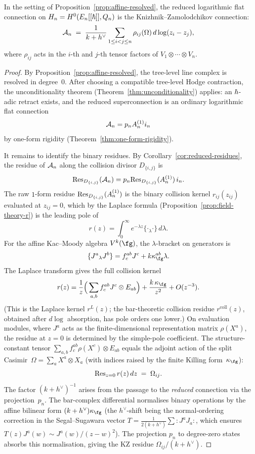 \begin{theorem}
\label{thm:reduced-equals-kz}
In the setting of Proposition~\textup{\ref{prop:affine-resolved}}, the reduced logarithmic flat connection on $H_n = H^0(E_n[[\hbar]], Q_n)$ is the Knizhnik--Zamolodchikov connection:
\[
 \mathcal A_n \;=\; \frac{1}{k + h^\vee}\sum_{1 \leq i < j \leq n} \rho_{ij}(\Omega)\, d\log(z_i - z_j),
\]
where $\rho_{ij}$ acts in the $i$-th and $j$-th tensor factors of\/ $V_1 \otimes \cdots \otimes V_n$.
\end{theorem}

\begin{proof}
By Proposition~\ref{prop:affine-resolved}, the tree-level line complex is resolved in degree~$0$. After choosing a compatible tree-level Hodge contraction, the unconditionality theorem (Theorem~\ref{thm:unconditionality}) applies: an $\hbar$-adic retract exists, and the reduced superconnection is an ordinary logarithmic flat connection
\[
 \mathcal A_n = p_n A_n^{(1)} i_n
\]
by one-form rigidity (Theorem~\ref{thm:one-form-rigidity}).

It remains to identify the binary residues. By Corollary~\ref{cor:reduced-residues}, the residue of $\mathcal A_n$ along the collision divisor $D_{\{i,j\}}$ is
\[
 \mathrm{Res}_{D_{\{i,j\}}}(\mathcal A_n) = p_n \mathrm{Res}_{D_{\{i,j\}}}(A_n^{(1)}) \, i_n.
\]
The raw $1$-form residue $\mathrm{Res}_{D_{\{i,j\}}}(A_n^{(1)})$ is the binary collision kernel $r_{ij}(z_{ij})$ evaluated at $z_{ij} = 0$, which by the Laplace formula (Proposition~\ref{prop:field-theory-r}) is the leading pole of
\[
 r(z) = \int_0^\infty e^{-\lambda z} \{\cdot{}_\lambda \cdot\}\, d\lambda.
\]
For the affine Kac--Moody algebra $V^k(\fg)$, the $\lambda$-bracket on generators is
\[
 \{J^a{}_\lambda J^b\} = f^{ab}_c J^c + k \kappa_\fg^{ab} \lambda.
\]
The Laplace transform gives the full collision kernel
\[
 r(z) = \frac{1}{z}\Big(\sum_{a,b} f^{ab}_c J^c \otimes E_{ab}\Big) + \frac{k\,\kappa_\fg}{z^2} + O(z^{-3}).
\]
\noindent
(This is the Laplace kernel $r^L(z)$; the bar-theoretic collision
residue $r^{\mathrm{coll}}(z)$, obtained after $d\log$ absorption,
has pole orders one lower.)
On evaluation modules, where $J^a$ acts as the finite-dimensional representation matrix $\rho(X^a)$, the residue at $z = 0$ is determined by the simple-pole coefficient. The structure-constant tensor $\sum_{a,b} f^{ab}_c \rho(X^c) \otimes E_{ab}$ equals the adjoint action of the split Casimir~$\Omega = \sum_a X^a \otimes X_a$ (with indices raised by the finite Killing form~$\kappa_\fg$):
\[
 \mathrm{Res}_{z=0}\, r(z)\,dz \;=\; \Omega_{ij}.
\]
The factor $(k + h^\vee)^{-1}$ arises from the passage to the \emph{reduced} connection via the projection~$p_n$. The bar-complex differential normalises binary operations by the affine bilinear form $(k + h^\vee)\kappa_\fg$ (the $h^\vee$-shift being the normal-ordering correction in the Segal--Sugawara vector $T = \tfrac{1}{2(k+h^\vee)} \sum{:}J^a J_a{:}$, which ensures $T(z)J^a(w) \sim J^a(w)/(z-w)^2$). The projection $p_n$ to degree-zero states absorbs this normalisation, giving the KZ residue $\Omega_{ij}/(k + h^\vee)$.


\end{proof}
